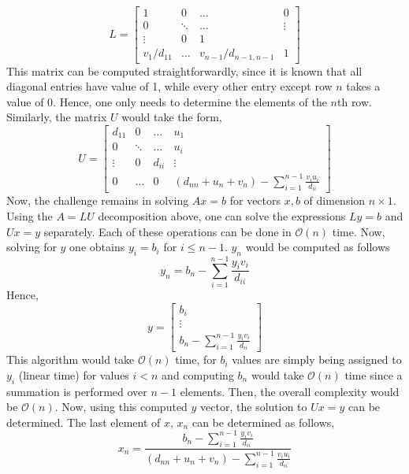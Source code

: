 \documentclass{article}
\begin{document}
$$ L = \begin{bmatrix}
   1   &  0 & \dots & 0  \\
      0   &    \ddots  & \dots  &   \vdots\\ 
        \vdots   &    0  &1  &    \\ 
v_{1}/d_{11}   & \dots  &  v_{n-1}/d_{n-1, n-1}   & 1 
\end{bmatrix} $$ 
This matrix can be computed straightforwardly, since it is known that all diagonal entries have value of 1, while every other entry except row $n$ takes a value of 0. Hence, one only needs to determine the elements of the $n$th row. 
Similarly, the matrix $U$ would take the form, 
$$ U = \begin{bmatrix}
   d_{11}   &  0 & \dots & u_{1}  \\
      0   &    \ddots  & \dots  &   u_{i}\\ 
        \vdots   &    0  &d_{ii}  &  \vdots  \\ 
0   & \dots  &   0   & (d_{nn} + u_{n} + v_{n}) - \sum_{i=1}^{n-1} \frac{v_{i}u_{i}}{d_{ii}}
\end{bmatrix} $$ 
Now, the challenge remains in solving $Ax = b$ for vectors $x, b$ of dimension $n \times 1$. Using the $A= LU$ decomposition above,  one can solve the expressions $Ly = b$ and $Ux = y$ separately. Each of these operations can be done in  $\mathcal{O}(n)$ time. Now, solving for $y$ one obtains $y_{i} = b_{i}$ for $i \leq n-1$. $y_{n}$ would be computed as follows \newline 
$$ y_{n} = b_{n} - \sum_{i=1}^{n-1} \frac{y_{i}v_{i}}{d_{ii}} $$ 
Hence, \newline
$$ y = \begin{bmatrix}
   b_{i}   \\
 \vdots \\ 
 b_{n} - \sum_{i=1}^{n-1} \frac{y_{i} v_{i} }{d_{ii}} 
\end{bmatrix}
$$ 
This algorithm would take  $\mathcal{O}(n)$ time, for $b_{i}$ values are simply being assigned to $y_{i}$ (linear time) for values $i < n$ and computing $b_{n}$ would take $\mathcal{O}(n)$ time since a summation is performed over $n-1$ elements. Then, the overall complexity would be $\mathcal{O}(n)$. \newline 
Now, using this computed $y$ vector, the solution to $Ux=y$ can be determined. The last element of $x$, $x_{n}$ can be determined as follows, 
$$ x_{n} = \frac{  b_{n} - \sum_{i=1}^{n-1} \frac{y_{i} v_{i} }{d_{ii}} }{ (d_{nn} + u_{n} + v_{n}) - \sum_{i=1}^{n-1} \frac{v_{i}u_{i}}{d_{ii}}} $$
\end{document}

